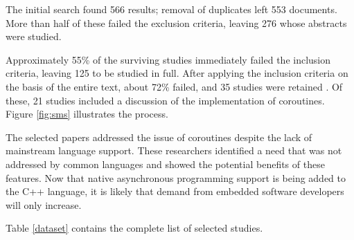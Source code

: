 \documentclass[format=acmsmall, review=false, screen=false]{acmart}
\providecommand{\DIFadd}[1]{{\protect\color{blue}\uwave{#1}}} %
\providecommand{\DIFaddbegin}{} %
\providecommand{\DIFaddend}{} %
\newcommand{\DIFaddincludegraphics}[2][]{{\color{blue}\fbox{\DIFOincludegraphics[#1]{#2}}}} %
\DeclareRobustCommand{\DIFaddbegin}{\DIFOaddbegin \let\includegraphics\DIFaddincludegraphics} %
\DeclareRobustCommand{\DIFaddend}{\DIFOaddend \let\includegraphics\DIFOincludegraphics} %
\begin{document}
The initial search found 566 results; removal of duplicates left 553 documents. More than half of these failed the exclusion criteria, leaving 276 whose abstracts were studied.

Approximately 55\% of the surviving studies immediately failed the inclusion criteria, leaving 125 to be studied in full. After applying the inclusion criteria on the basis of the entire text, about 72\% failed, and 35 studies were retained \cite{Alvira2013, Andalam2014, Andersen2016, Andersen2017b, Bergel2011, Boers2010, Clark2009, Cohen2007b, Durmaz2017, Elsts2017, Evers2007, Fritzsche2010, Glistvain2010, Inam2011, Jaaskelainen2008, Jahier2016, Kalebe2017, Karpin2007, Khezri2008, Kugler2013, Kumar2007, Liu2011, Lohmann2012, Motika2015, Niebert2014, Noman2017, Oldewurtel2009, Park2015, Riedel2010, Schimpf2012b, St-Amour2010, Strube2010, Susilo2009, VonHanxleden2009, Yu2008}. Of these, 21 studies included a discussion of the implementation of coroutines. \DIFaddbegin \DIFadd{The lower half of }\DIFaddend Figure \ref{fig:sms} illustrates the process.

The selected papers addressed the issue of coroutines despite the lack of mainstream language support. These researchers identified a need that was not addressed by common languages and showed the potential benefits of these features. Now that native asynchronous programming support is being added to the C++ language, it is likely that demand from embedded software developers will only increase. 

\iffalse 
Table \ref{dataset} contains the complete list of selected studies.
\end{document}
